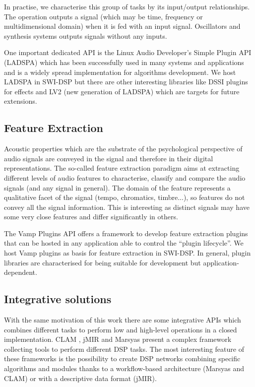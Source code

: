 \documentclass[runningheads]{llncs}
\begin{document}
In practise, we characterise this group of tasks by its input/output relationships. The operation outputs a signal (which may be time, frequency or multidimensional domain) when it is fed with an input signal. Oscillators and synthesis systems outputs signals without any inputs.

One important dedicated API is the Linux Audio Developer's Simple Plugin API (LADSPA) \cite{ladspa}  which has been successfully used in many systems and applications and is a widely spread implementation for algorithms development. We host LADSPA in SWI-DSP but there are other interesting libraries like DSSI plugins for effects and LV2 (new generation of LADSPA) which are targets for future extensions.

\subsection{Feature Extraction}\label{subsec:feature}

Acoustic properties which are the substrate of the psychological perspective of audio signals are conveyed in the signal and therefore in their digital representations. The so-called feature extraction paradigm aims at extracting different levels of audio features to characterise, classify and compare the audio signals (and any signal in general). The domain of the feature represents a qualitative facet of the signal (tempo, chromatics, timbre...), so features do not convey all the signal information. This is interesting as distinct signals may have some very close features and differ significantly in others.

The Vamp Plugins API \cite{vamp} offers a framework to develop feature extraction plugins that can be hosted in any application able to control the ``plugin lifecycle''. We host Vamp plugins as basis for feature extraction in SWI-DSP. In general, plugin libraries are characterised for being suitable for development but application-dependent.

\subsection{Integrative solutions}\label{subsec:inte}

With the same motivation of this work there are some integrative APIs which combines different tasks to perform low and high-level operations in a closed implementation. CLAM \cite{clam}, jMIR \cite{jmir} and Marsyas \cite{marsyas} present a complex framework collecting tools to perform different DSP tasks. The most interesting feature of these frameworks is the possibility to create DSP networks combining specific algorithms and modules thanks to a workflow-based architecture (Marsyas and CLAM) or with a descriptive data format (jMIR).
\end{document}
